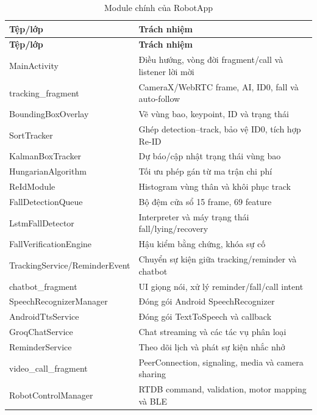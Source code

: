 \begin{longtable}{|p{4.4cm}|p{8.9cm}|}
\caption{Module chính của RobotApp}\\
\hline
\textbf{Tệp/lớp} & \textbf{Trách nhiệm} \\
\hline
\endfirsthead
\hline
\textbf{Tệp/lớp} & \textbf{Trách nhiệm} \\
\hline
\endhead
MainActivity & Điều hướng, vòng đời fragment/call và listener lời mời \\
\hline
tracking\_fragment & CameraX/WebRTC frame, AI, ID0, fall và auto-follow \\
\hline
BoundingBoxOverlay & Vẽ vùng bao, keypoint, ID và trạng thái \\
\hline
SortTracker & Ghép detection--track, bảo vệ ID0, tích hợp Re-ID \\
\hline
KalmanBoxTracker & Dự báo/cập nhật trạng thái vùng bao \\
\hline
HungarianAlgorithm & Tối ưu phép gán từ ma trận chi phí \\
\hline
ReIdModule & Histogram vùng thân và khôi phục track \\
\hline
FallDetectionQueue & Bộ đệm cửa sổ 15 frame, 69 feature \\
\hline
LstmFallDetector & Interpreter và máy trạng thái fall/lying/recovery \\
\hline
FallVerificationEngine & Hậu kiểm bằng chứng, khóa sự cố \\
\hline
TrackingService/\allowbreak ReminderEvent & Chuyển sự kiện giữa tracking/reminder và chatbot \\
\hline
chatbot\_fragment & UI giọng nói, xử lý reminder/fall/call intent \\
\hline
SpeechRecognizer\allowbreak Manager & Đóng gói Android SpeechRecognizer \\
\hline
AndroidTtsService & Đóng gói TextToSpeech và callback \\
\hline
GroqChatService & Chat streaming và các tác vụ phân loại \\
\hline
ReminderService & Theo dõi lịch và phát sự kiện nhắc nhở \\
\hline
video\_call\_fragment & PeerConnection, signaling, media và camera sharing \\
\hline
RobotControlManager & RTDB command, validation, motor mapping và BLE \\
\hline
\end{longtable}

